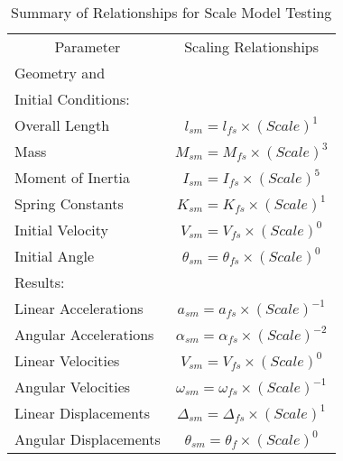 \begin{table}
\begin{center}
\caption{Summary of Relationships for Scale Model Testing}
\makeqnum
\begin{tabular}{||l|c||}
\hline
\multicolumn{1}{|c}{Parameter}
 &\multicolumn{1}{|c||}{Scaling Relationships}\\
Geometry and & \\
Initial Conditions: &\\
\quad Overall Length     & $l_{sm} = l_{fs} \times (Scale)^{1}$\\
\quad Mass               & $M_{sm} = M_{fs} \times (Scale)^{3}$\\
\quad Moment of Inertia  & $I_{sm} = I_{fs} \times (Scale)^{5}$\\
\quad Spring Constants   & $K_{sm} = K_{fs} \times (Scale)^{1}$\\
\quad Initial Velocity   & $V_{sm} = V_{fs} \times (Scale)^{0}$\\
\quad Initial Angle      & $\theta _{sm} = \theta _{fs} \times
(Scale)^{0}$\\
\hline
Results: & \\
\quad    Linear Accelerations  & $a_{sm} = a_{fs} \times (Scale)^{-1}$\\
\quad    Angular Accelerations & $\alpha _{sm} = \alpha _{fs} \times
(Scale)^{-2}$\\
\quad    Linear Velocities     & $V_{sm} = V_{fs} \times (Scale)^{0}$\\
\quad    Angular Velocities    & $\omega _{sm} = \omega _{fs} \times
(Scale)^{-1}$\\
\quad    Linear Displacements  & $\Delta _{sm} = \Delta _{fs} \times
(Scale)^{1}$\\
\quad    Angular Displacements & $\theta _{sm} = \theta _{f} \times
(Scale)^{0}$\\
\hline
\end{tabular}
\end{center}
\end{table}
